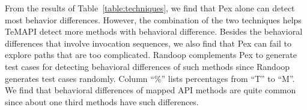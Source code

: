 From the results of Table~\ref{table:techniques}, we find that Pex alone can detect most behavior differences. However, the combination of the two techniques helps TeMAPI detect more methods with behavioral difference. Besides the behavioral differences that involve invocation sequences, we also find that Pex can fail to explore paths that are too complicated. Randoop complements Pex to generate test cases for detecting behavioral differences of such methods since Randoop generates test cases randomly. Column ``\%'' lists percentages from ``T'' to ``M''. We find that behavioral differences of mapped API methods are quite common since about one third methods have such differences.

%
%
